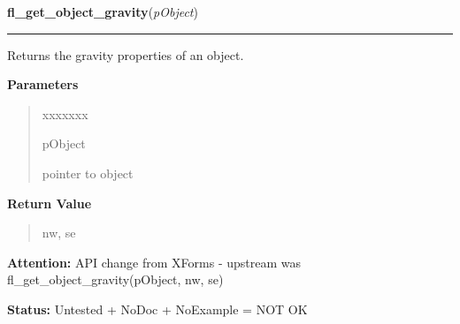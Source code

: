 \hspace{.8\funcindent}\begin{boxedminipage}{\funcwidth}

    \raggedright \textbf{fl\_get\_object\_gravity}(\textit{pObject})

    \vspace{-1.5ex}

    \rule{\textwidth}{0.5\fboxrule}
\setlength{\parskip}{2ex}
    Returns the gravity properties of an object.

\setlength{\parskip}{1ex}
      \textbf{Parameters}
      \vspace{-1ex}

      \begin{quote}
        \begin{Ventry}{xxxxxxx}

          \item[pObject]

          pointer to object

        \end{Ventry}

      \end{quote}

      \textbf{Return Value}
    \vspace{-1ex}

      \begin{quote}
      nw, se

      \end{quote}

\textbf{Attention:} API change from XForms - upstream was fl\_get\_object\_gravity(pObject, nw,
se)



\textbf{Status:} Untested + NoDoc + NoExample = NOT OK



    \end{boxedminipage}

    \label{xformslib:library:fl_set_object_lsize}

    \vspace{0.5ex}

